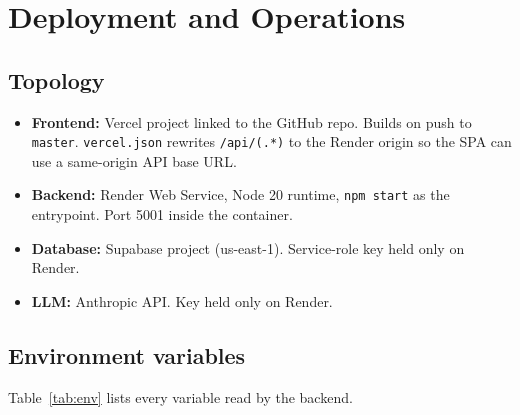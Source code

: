 \section{Deployment and Operations}
\label{sec:deploy}

\subsection{Topology}

\begin{itemize}[leftmargin=*]
  \item \textbf{Frontend:} Vercel project linked to the GitHub repo.
        Builds on push to \texttt{master}. \texttt{vercel.json} rewrites
        \texttt{/api/(.*)} to the Render origin so the SPA can use a
        same-origin API base URL.
  \item \textbf{Backend:} Render Web Service, Node 20 runtime,
        \texttt{npm start} as the entrypoint. Port 5001 inside the
        container.
  \item \textbf{Database:} Supabase project (us-east-1). Service-role key
        held only on Render.
  \item \textbf{LLM:} Anthropic API. Key held only on Render.
\end{itemize}

\subsection{Environment variables}

Table~\ref{tab:env} lists every variable read by the backend.

